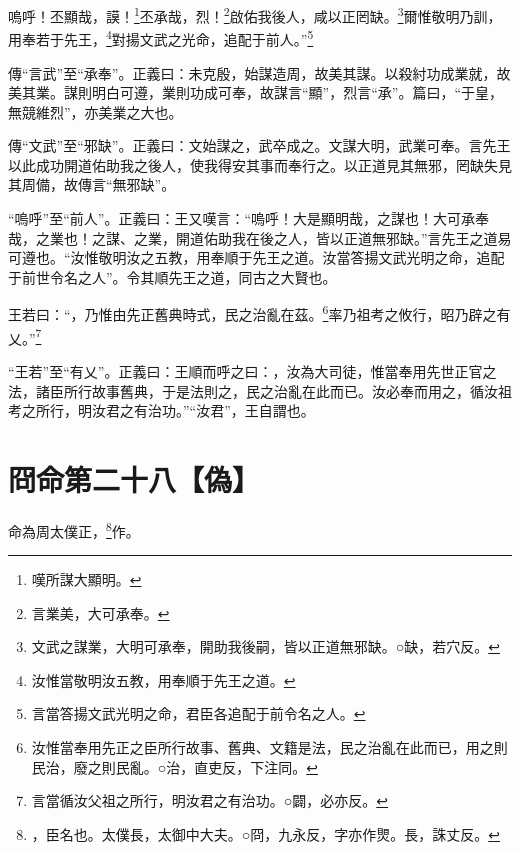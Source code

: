 嗚呼！丕顯哉，謨！\footnote{嘆所謀大顯明。}丕承哉，烈！\footnote{言業美，大可承奉。}啟佑我後人，咸以正罔缺。\footnote{文武之謀業，大明可承奉，開助我後嗣，皆以正道無邪缺。○缺，若穴反。}爾惟敬明乃訓，用奉若于先王，\footnote{汝惟當敬明汝五教，用奉順于先王之道。}對揚文武之光命，追配于前人。”\footnote{言當答揚文武光明之命，君臣各追配于前令名之人。}


{\noindent\zhuan{}\fzbyks 傳“言武”至“承奉”。正義曰：未克殷，始謀造周，故美其謀。以殺紂功成業就，故美其業。謀則明白可遵，業則功成可奉，故謀言“顯”，烈言“承”。篇曰，“于皇，無競維烈”，亦美業之大也。 \par}

{\noindent\zhuan{}\fzbyks 傳“文武”至“邪缺”。正義曰：文始謀之，武卒成之。文謀大明，武業可奉。言先王以此成功開道佑助我之後人，使我得安其事而奉行之。以正道見其無邪，罔缺失見其周備，故傳言“無邪缺”。 \par}

{\noindent\shu{}\fzkt “嗚呼”至“前人”。正義曰：王又嘆言：“嗚呼！大是顯明哉，之謀也！大可承奉哉，之業也！之謀、之業，開道佑助我在後之人，皆以正道無邪缺。”言先王之道易可遵也。“汝惟敬明汝之五教，用奉順于先王之道。汝當答揚文武光明之命，追配于前世令名之人”。令其順先王之道，同古之大賢也。 \par}

王若曰：“，乃惟由先正舊典時式，民之治亂在茲。\footnote{汝惟當奉用先正之臣所行故事、舊典、文籍是法，民之治亂在此而已，用之則民治，廢之則民亂。○治，直吏反，下注同。}率乃祖考之攸行，昭乃辟之有乂。”\footnote{言當循汝父祖之所行，明汝君之有治功。○闢，必亦反。}

{\noindent\shu{}\fzkt “王若”至“有乂”。正義曰：王順而呼之曰：，汝為大司徒，惟當奉用先世正官之法，諸臣所行故事舊典，于是法則之，民之治亂在此而已。汝必奉而用之，循汝祖考之所行，明汝君之有治功。”“汝君”，王自謂也。 \par}

\section{冏命第二十八【偽】}


命為周太僕正，\footnote{，臣名也。太僕長，太御中大夫。○冏，九永反，字亦作煛。長，誅丈反。}作。

